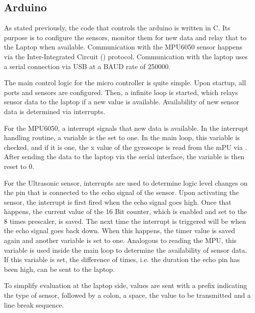 \subsection{Arduino}
\label{subsec:arduino}

As stated previously, the code that controls the arduino is written in C.
Its purpose is to configure the sensors, monitor them for new data and relay that to the Laptop when available.
Communication with the MPU6050 sensor happens via the Inter-Integrated Circuit (\IIC) protocol.
Communication with the laptop uses a serial connection via USB at a BAUD rate of 250000.


The main control logic for the micro controller is quite simple. Upon startup, all ports and sensors are configured.
Then, a infinite loop is started, which relays sensor data to the laptop if a new value is available.
Availability of new sensor data is determined via interrupts.

For the MPU6050, a interrupt signals that new data is available. In the interrupt handling routine, a variable is the set to one.
In the main loop, this variable is checked, and if it is one, the x value of the gyroscope is read from the mPU via \IIC.
After sending the data to the laptop via the serial interface, the variable is then reset to 0.

For the Ultrasonic sensor, interrupts are used to determine logic level changes on the pin that is connected to the echo signal of the sensor.
Upon activating the sensor, the interrupt is first fired when the echo signal goes high. 
Once that happens, the current value of the 16 Bit counter, which is enabled and set to the 8 times prescaler, is saved.
The next time the interrupt is triggered will be when the echo signal goes back down. 
When this happens, the timer value is saved again and another variable is set to one. Analogous to reading the MPU,
this variable is used inside the main loop to determine the availability of sensor data. If this variable is set,
the difference of times, i.e. the duration the echo pin has been high, can be sent to the laptop.

To simplify evaluation at the laptop side, values are sent with a prefix indicating the type of sensor, 
followed by a colon, a space, the value to be transmitted and a line break sequence. 
